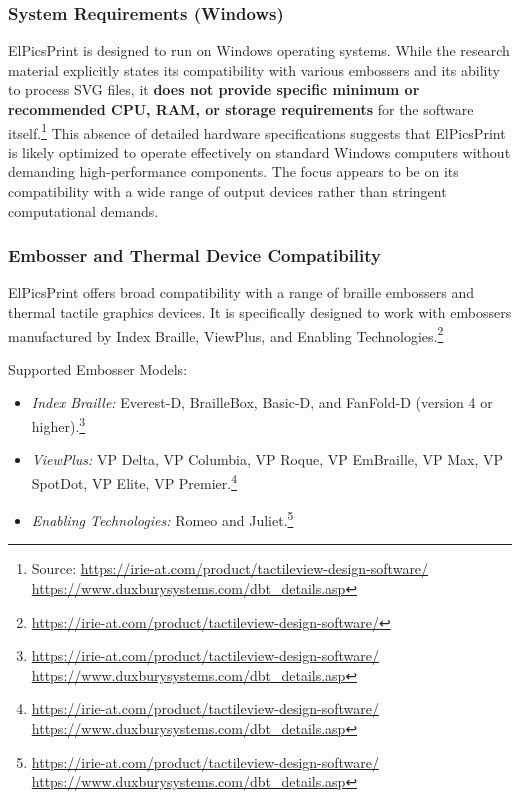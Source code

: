 \subsubsection{System Requirements (Windows)}

ElPicsPrint is designed to run on Windows operating systems. While the research material explicitly states its compatibility with various embossers and its ability to process SVG files, it \textbf{does not provide specific minimum or recommended CPU, RAM, or storage requirements} for the software itself.\footnote{Source:  \url{https://irie-at.com/product/tactileview-design-software/} \url{https://www.duxburysystems.com/dbt_details.asp}} This absence of detailed hardware specifications suggests that ElPicsPrint is likely optimized to operate effectively on standard Windows computers without demanding high-performance components. The focus appears to be on its compatibility with a wide range of output devices rather than stringent computational demands.

\subsubsection{Embosser and Thermal Device Compatibility}

ElPicsPrint offers broad compatibility with a range of braille embossers and thermal tactile graphics devices. It is specifically designed to work with embossers manufactured by Index Braille, ViewPlus, and Enabling Technologies.\footnote{\url{https://irie-at.com/product/tactileview-design-software/}}

Supported Embosser Models:
\begin{itemize}
    \item \emph{Index Braille:} Everest-D, BrailleBox, Basic-D, and FanFold-D (version 4 or higher).\footnote{\url{https://irie-at.com/product/tactileview-design-software/} \url{https://www.duxburysystems.com/dbt_details.asp}}
    \item \emph{ViewPlus:} VP Delta, VP Columbia, VP Roque, VP EmBraille, VP Max, VP SpotDot, VP Elite, VP Premier.\footnote{\url{https://irie-at.com/product/tactileview-design-software/} \url{https://www.duxburysystems.com/dbt_details.asp}}
    \item \emph{Enabling Technologies:} Romeo and Juliet.\footnote{\url{https://irie-at.com/product/tactileview-design-software/} \url{https://www.duxburysystems.com/dbt_details.asp}}
\end{itemize}

